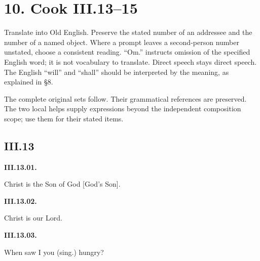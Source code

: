 \section*{10. Cook III.13–15}

Translate into Old English. Preserve the stated number of an addressee and the number of a named object. Where a prompt leaves a second-person number unstated, choose a consistent reading. “Om.” instructs omission of the specified English word; it is not vocabulary to translate. Direct speech stays direct speech. The English “will” and “shall” should be interpreted by the meaning, as explained in §8.

The complete original sets follow. Their grammatical references are preserved. The two local helps supply expressions beyond the independent composition scope; use them for their stated items.

\subsection*{III.13}

\par\begin{minipage}{\linewidth}\raggedright
\textbf{III.13.01.}

Christ is the Son of God [God’s Son].

\end{minipage}\par\addvspace{4pt}

\par\begin{minipage}{\linewidth}\raggedright
\textbf{III.13.02.}

Christ is our Lord.

\end{minipage}\par\addvspace{4pt}

\par\begin{minipage}{\linewidth}\raggedright
\textbf{III.13.03.}

When saw I you (sing.) hungry?

\end{minipage}\par\addvspace{4pt}

